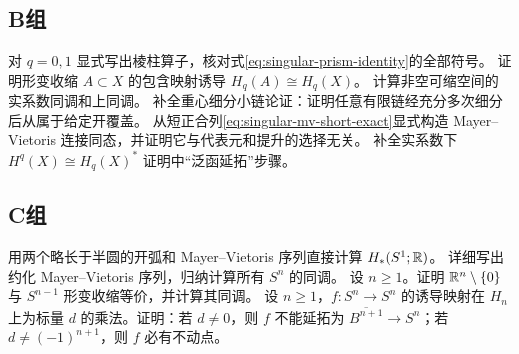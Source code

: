 \subsection*{B组}
\begin{enumerate}[label=\textbf{\thechapter.\arabic*.},resume]
对 $q=0,1$ 显式写出棱柱算子，核对式\eqref{eq:singular-prism-identity}的全部符号。
证明形变收缩 $A\subset X$ 的包含映射诱导 $H_q(A)\cong H_q(X)$。
计算非空可缩空间的实系数同调和上同调。
补全重心细分小链论证：证明任意有限链经充分多次细分后从属于给定开覆盖。
从短正合列\eqref{eq:singular-mv-short-exact}显式构造 Mayer--Vietoris 连接同态，并证明它与代表元和提升的选择无关。
补全实系数下 $H^q(X)\cong H_q(X)^*$ 证明中“泛函延拓”步骤。
\end{enumerate}
\subsection*{C组}
\begin{enumerate}[label=\textbf{\thechapter.\arabic*.},resume]
用两个略长于半圆的开弧和 Mayer--Vietoris 序列直接计算 $H_*(S^1;\mathbb{R})$。
详细写出约化 Mayer--Vietoris 序列，归纳计算所有 $S^n$ 的同调。
设 $n\ge1$。证明 $\mathbb{R}^n\setminus\{0\}$ 与 $S^{n-1}$ 形变收缩等价，并计算其同调。
设 $n\ge1$，$f:S^n\to S^n$ 的诱导映射在 $H_n$ 上为标量 $d$ 的乘法。证明：若 $d\ne0$，则 $f$ 不能延拓为 $\overline{B^{n+1}}\to S^n$；若 $d\ne(-1)^{n+1}$，则 $f$ 必有不动点。
\end{enumerate}
